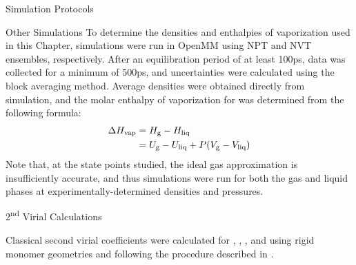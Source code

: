 \begin{subsection}{Simulation Protocols}
\begin{subsubsection}{Other \co Simulations}
To determine the densities and enthalpies of vaporization used in this Chapter,
simulations were run in OpenMM using NPT and NVT ensembles, respectively. After an
equilibration period of at least 100ps, data was collected for a minimum of 500ps, and
uncertainties were calculated using the block averaging method. Average densities
were obtained directly from simulation, and 
the molar enthalpy of vaporization for \co was determined from the following
formula:
%
\begin{align}
\begin{split}
\Delta H_{\text{vap}} &= H_{\text{g}} - H_{\text{liq}} \\
           &= U_{\text{g}} - U_{\text{liq}} + P(V_{\text{g}} - V_{\text{liq}})
\end{split}
\end{align}
%
Note that, at the state points studied, the ideal gas approximation is
insufficiently accurate, and thus simulations were run for both the gas and
liquid phases at experimentally-determined
densities and pressures.\cite{Span1996}

\end{subsubsection}
\begin{subsubsection}{2\textsuperscript{nd} Virial Calculations}

Classical second virial coefficients were calculated for \nh, \ho, \co,
and \cl using rigid monomer geometries and following the procedure described in
.


\end{subsubsection}
\end{subsection}


